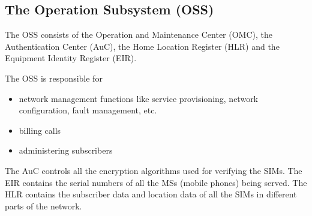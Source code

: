 \subsection{The Operation Subsystem (OSS)}

The OSS consists of the Operation and Maintenance Center (OMC), the 
Authentication Center (AuC), the Home Location Register (HLR) and the 
Equipment Identity Register (EIR).

The OSS is responsible for
\begin{itemize}[noitemsep,topsep=0pt,parsep=0pt,partopsep=0pt]
\item network management functions like service provisioning, network 
configuration, fault management, etc.
\item billing calls
\item administering subscribers
\end{itemize}

The AuC controls all the encryption algorithms used for verifying the SIMs. 
The EIR contains the serial numbers of all the MSs (mobile phones) being 
served. The HLR contains the subscriber data and location data of all the 
SIMs in different parts of the network.

% 



